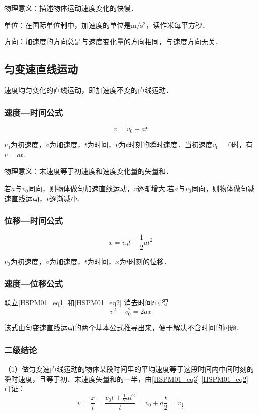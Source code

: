 物理意义：描述物体运动速度变化的快慢．

单位：在国际单位制中，加速度的单位是$\mathrm{m/s^2}$，读作米每平方秒．

方向：加速度的方向总是与速度变化量的方向相同，与速度方向无关．

\subsection{匀变速直线运动}
速度均匀变化的直线运动，即加速度不变的直线运动．
\subsubsection{速度—时间公式}
\begin{equation}\label{HSPM01_eq1}
v=v_0+at
\end{equation}

$v_0$为初速度，$a$为加速度，$t$为时间，$v$为$t$时刻的瞬时速度．当初速度$v_0=0$时，有$v=at$.

物理意义：末速度等于初速度和速度变化量的矢量和．

若$a$与$v_0$同向，则物体做匀加速直线运动，$v$逐渐增大.若$a$与$v_0$同向，则物体做匀减速直线运动，$v$逐渐减小.

\subsubsection{位移—时间公式}
\begin{equation}\label{HSPM01_eq2}
x=v_0 t+\frac12at^2
\end{equation}

$v_0$为初速度，$a$为加速度，$t$为时间，$x$为$t$时刻的位移．

\subsubsection{速度—位移公式}
联立\autoref{HSPM01_eq1} 和\autoref{HSPM01_eq2} 消去时间$t$可得
\begin{equation}\label{HSPM01_eq4}
v^2-v_0^2=2ax
\end{equation}

该式由匀变速直线运动的两个基本公式推导出来，便于解决不含时间的问题．

\subsubsection{二级结论}
（1）做匀变速直线运动的物体某段时间里的平均速度等于这段时间内中间时刻的瞬时速度，且等于初、末速度矢量和的一半，由\autoref{HSPM01_eq3} \autoref{HSPM01_eq2} 可证：
\begin{equation}
\bar v=\frac xt=\frac{v_0t+\frac 12at^2}{t}=v_0+a\frac t2=v_{\frac t2}
\end{equation}

